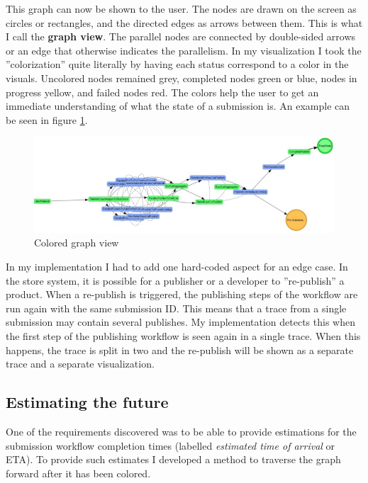 
This graph can now be shown to the user.
The nodes are drawn on the screen as circles or rectangles, and the directed edges as arrows between them.
This is what I call the \textbf{graph view}.
The parallel nodes are connected by double-sided arrows or an edge that otherwise indicates the parallelism.
In my visualization I took the ''colorization'' quite literally by having each status correspond to a color in the visuals. 
Uncolored nodes remained grey, completed nodes green or blue, nodes in progress yellow, and failed nodes red.
The colors help the user to get an immediate understanding of what the state of a submission is.
An example can be seen in figure \ref{fig:coloredgraph}.

\begin{figure}[htb]
    \centering \includegraphics[width=0.9\linewidth]{gfx/graphcolor.png}
    \caption{Colored graph view}
    \label{fig:coloredgraph}
\end{figure}

In my implementation I had to add one hard-coded aspect for an edge case. In the store system, it is possible for a publisher or a developer to ''re-publish'' a product. 
When a re-publish is triggered, the publishing steps of the workflow are run again with the same submission ID. 
This means that a trace from a single submission may contain several publishes.
My implementation detects this when the first step of the publishing workflow is seen again in a single trace. 
When this happens, the trace is split in two and the re-publish will be shown as a separate trace and a separate visualization.

\subsection{Estimating the future}

One of the requirements discovered  was to be able to provide estimations for the submission workflow completion times (labelled \emph{estimated time of arrival} or ETA). 
To provide such estimates I developed a method to traverse the graph forward after it has been colored.

